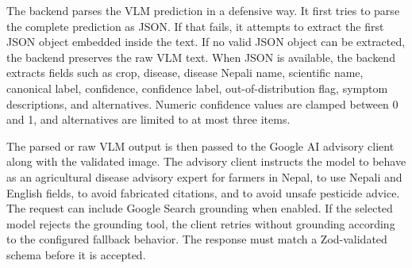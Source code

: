 
The backend parses the VLM prediction in a defensive way. It first tries to parse the complete
prediction as JSON. If that fails, it attempts to extract the first JSON object embedded inside the
text. If no valid JSON object can be extracted, the backend preserves the raw VLM text. When JSON
is available, the backend extracts fields such as crop, disease, disease Nepali name, scientific
name, canonical label, confidence, confidence label, out-of-distribution flag, symptom
descriptions, and alternatives. Numeric confidence values are clamped between 0 and 1, and
alternatives are limited to at most three items.

The parsed or raw VLM output is then passed to the Google AI advisory client along with the
validated image. The advisory client instructs the model to behave as an agricultural disease
advisory expert for farmers in Nepal, to use Nepali and English fields, to avoid fabricated
citations, and to avoid unsafe pesticide advice. The request can include Google Search grounding
when enabled. If the selected model rejects the grounding tool, the client retries without
grounding according to the configured fallback behavior. The response must match a Zod-validated
schema before it is accepted.

